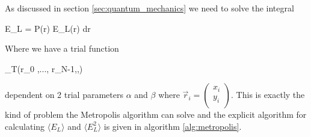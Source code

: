 As discussed in section \ref{sec:quantum_mechanics} we need to solve the integral 

\eqs \langle E_L \rangle = \int P(\vec r) E_L(\vec r) d\vec r \eqf

Where we have a trial function 

\eqs \Psi_T(\vec r_0 ,..., \vec r_{N-1},\alpha,\beta) \eqf

dependent on 2 trial parameters $\alpha$ and $\beta$
where $\vec r_i = \left ( \begin{matrix} x_i \\ y_i \\ \end{matrix} \right )$.
This is exactly the kind of problem the Metropolis algorithm can solve and the explicit algorithm for calculating $\langle E_L \rangle$ and $\langle E_L^2 \rangle$ is given in algorithm \ref{alg:metropolis}.






